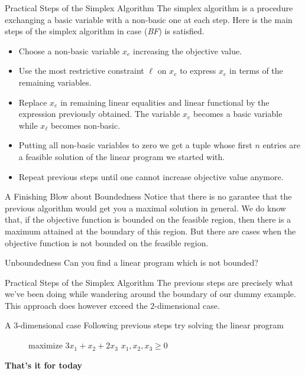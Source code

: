 \documentclass[aspectratio = 169]{beamer}
\begin{document}
\begin{frame}{Practical Steps of the Simplex Algorithm}
  The simplex algorithm is a procedure exchanging a basic variable
  with a non-basic one at each step. \pause Here is the main steps of
  the simplex algorithm in case (\emph{BF}) is satisfied.
  \begin{itemize}
  \item<2->[\textbullet] 
    Choose a non-basic variable $x_e$ increasing the objective
    value.
  \item<3->[\textbullet] 
    Use the most restrictive constraint $\ell$ on $x_e$ to
    express $x_e$ in terms of the remaining variables.
  \item<4->[\textbullet] 
    Replace $x_e$ in remaining linear equalities and linear
    functional by the expression previously obtained. The
    variable $x_e$ becomes a basic variable while $x_\ell$
    becomes non-basic.
  \item<5->[\textbullet] 
    Putting all non-basic variables to zero we get a tuple whose
    first $n$ entries are a feasible solution of the linear
    program we started with.
  \item<6->[\textbullet] 
    Repeat previous steps until one cannot increase objective
    value anymore.
  \end{itemize}
\end{frame}

\begin{frame}{A Finishing Blow about Boundedness}
  Notice that there is no garantee that the previous algorithm would
  get you a maximal solution in general. We do know that, if the
  objective function is bounded on the feasible region, then there is
  a maximum attained at the boundary of this region. But there are
  cases when the objective function is not bounded on the feasible
  region.
  \begin{halfshyblock}{Unboundedness}
    Can you find a linear program which is not bounded?
  \end{halfshyblock}
\end{frame}

\begin{frame}{Practical Steps of the Simplex Algorithm}    
  The previous steps are precisely what we've been doing while
  wandering around the boundary of our dummy example. This approach
  does however exceed the $2$-dimensional case.
  \begin{halfshyblock}{A $3$-dimensional case}
    Following previous steps try solving the linear program
    \begin{figure}
      \begin{linearProg}{
          maximize
        }{
          $3x_1 + x_2 + 2x_3 $
        }{
        }{
          $x_1, x_2, x_3 \geq 0 $
        }
      \end{linearProg}
    \end{figure}
  \end{halfshyblock}
\end{frame}

\begin{frame}
  \begin{center}
    {\huge \textbf{That's it for today}}
  \end{center}
\end{frame}



\end{document}
